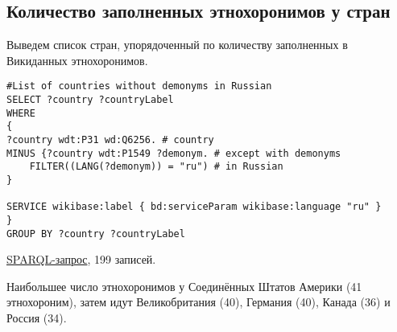 \subsection{Количество заполненных этнохоронимов у стран}

Выведем список стран, упорядоченный по количеству заполненных в Викиданных этнохоронимов.

\begin{lstlisting}[language=SPARQL label=countcountry, caption=Cтраны упорядоченные по количеству заполненных этнохоронимов]
#List of countries without demonyms in Russian
SELECT ?country ?countryLabel 
WHERE
{
?country wdt:P31 wd:Q6256. # country
MINUS {?country wdt:P1549 ?demonym. # except with demonyms
    FILTER((LANG(?demonym)) = "ru") # in Russian
} 

SERVICE wikibase:label { bd:serviceParam wikibase:language "ru" }
}
GROUP BY ?country ?countryLabel
\end{lstlisting}

\href{https://query.wikidata.org/#%23Count%20of%20demonyms%20in%20countries%0ASELECT%20%20%3Fcountry%20%3FcountryLabel%20%28count%28%2a%29%20as%20%3Fcount%29%0AWHERE%0A%7B%0A%09%3Fcountry%20wdt%3AP31%20wd%3AQ6256.%20%20%20%20%20%20%23country%0A%09%3Fcountry%20wdt%3AP1549%20%3Fdemonym%20.%20%20%20%23demonym%0A%09SERVICE%20wikibase%3Alabel%20%7B%20bd%3AserviceParam%20wikibase%3Alanguage%20%22ru%22%20%7D%0A%7D%0A%0AGROUP%20BY%20%3Fcountry%20%3FcountryLabel%20%0AORDER%20BY%20DESC%28%3Fcount%29%0A}{SPARQL-запрос}, 199 записей. 

Наибольшее число этнохоронимов у Соединённых Штатов Америки (41 этнохороним), затем идут Великобритания (40), Германия (40), Канада (36) и Россия (34).